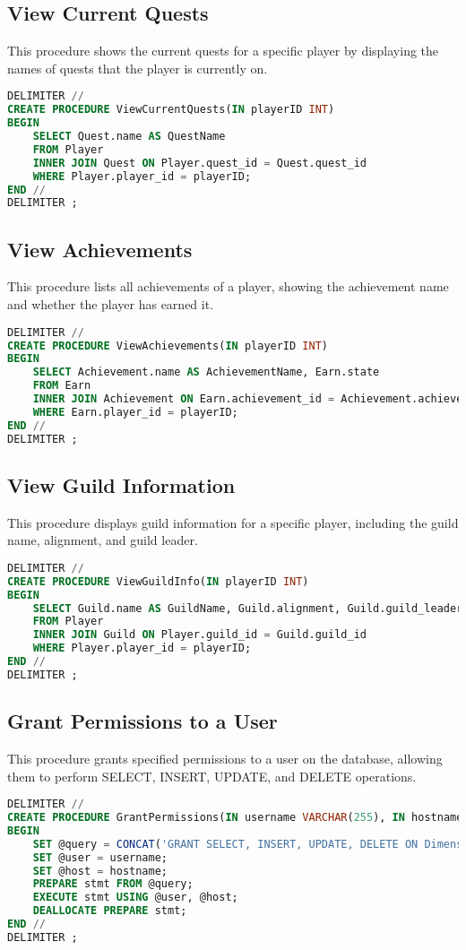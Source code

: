 \documentclass{article}
\begin{document}
\subsection{View Current Quests}
This procedure shows the current quests for a specific player by displaying the names of quests that the player is currently on.
\begin{lstlisting}[language=sql,caption=View Current Quests]
DELIMITER //
CREATE PROCEDURE ViewCurrentQuests(IN playerID INT)
BEGIN
    SELECT Quest.name AS QuestName
    FROM Player
    INNER JOIN Quest ON Player.quest_id = Quest.quest_id
    WHERE Player.player_id = playerID;
END //
DELIMITER ;
\end{lstlisting}

\subsection{View Achievements}
This procedure lists all achievements of a player, showing the achievement name and whether the player has earned it.
\begin{lstlisting}[language=sql,caption=View Achievements]
DELIMITER //
CREATE PROCEDURE ViewAchievements(IN playerID INT)
BEGIN
    SELECT Achievement.name AS AchievementName, Earn.state
    FROM Earn
    INNER JOIN Achievement ON Earn.achievement_id = Achievement.achievement_id
    WHERE Earn.player_id = playerID;
END //
DELIMITER ;
\end{lstlisting}

\subsection{View Guild Information}
This procedure displays guild information for a specific player, including the guild name, alignment, and guild leader.
\begin{lstlisting}[language=sql,caption=View Guild Information]
DELIMITER //
CREATE PROCEDURE ViewGuildInfo(IN playerID INT)
BEGIN
    SELECT Guild.name AS GuildName, Guild.alignment, Guild.guild_leader
    FROM Player
    INNER JOIN Guild ON Player.guild_id = Guild.guild_id
    WHERE Player.player_id = playerID;
END //
DELIMITER ;
\end{lstlisting}

\subsection{Grant Permissions to a User}
This procedure grants specified permissions to a user on the database, allowing them to perform SELECT, INSERT, UPDATE, and DELETE operations.
\begin{lstlisting}[language=sql,caption=Grant Permissions to a User]
DELIMITER //
CREATE PROCEDURE GrantPermissions(IN username VARCHAR(255), IN hostname VARCHAR(255))
BEGIN
    SET @query = CONCAT('GRANT SELECT, INSERT, UPDATE, DELETE ON Dimensional_Transfer.* TO ?@?');
    SET @user = username;
    SET @host = hostname;
    PREPARE stmt FROM @query;
    EXECUTE stmt USING @user, @host;
    DEALLOCATE PREPARE stmt;
END //
DELIMITER ;
\end{lstlisting}
\end{document}
